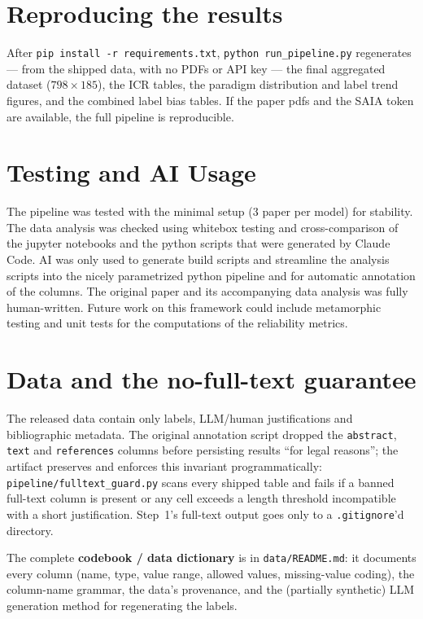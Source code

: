 \documentclass[english,biblatex]{lni}
\begin{document}
\section{Reproducing the results}
After \texttt{pip install -r requirements.txt}, \texttt{python run\_pipeline.py}
regenerates --- from the shipped data, with no PDFs or API key --- the final
aggregated dataset ($798\times185$), the ICR tables, the paradigm distribution and
label trend figures, and the combined label bias tables. If the paper pdfs and the SAIA
token are available, the full pipeline is reproducible.

\section{Testing and AI Usage}

The pipeline was tested with the minimal setup (3 paper per model) for stability.
The data analysis was checked using whitebox testing and cross-comparison of the
jupyter notebooks and the python scripts that were generated by Claude Code.
AI was only used to generate build scripts and streamline the analysis scripts into
the nicely parametrized python pipeline and for automatic annotation of the columns.
The original paper and its accompanying data analysis was fully human-written.
Future work on this framework could include metamorphic testing and unit tests for the computations of
the reliability metrics.

\section{Data and the no-full-text guarantee}
The released data contain only labels, LLM/human justifications and bibliographic
metadata. The original annotation script dropped the \texttt{abstract},
\texttt{text} and \texttt{references} columns before persisting results ``for legal
reasons''; the artifact preserves and enforces this invariant programmatically:
\texttt{pipeline/fulltext\_guard.py} scans every shipped table and fails if a banned
full-text column is present or any cell exceeds a length threshold incompatible with
a short justification. Step~1's full-text output goes only to a \texttt{.gitignore}'d
directory.

The complete \textbf{codebook / data dictionary} is in \texttt{data/README.md}: it
documents every column (name, type, value range, allowed values, missing-value
coding), the column-name grammar, the data's provenance, and the (partially
synthetic) LLM generation method for regenerating the labels.
\end{document}
